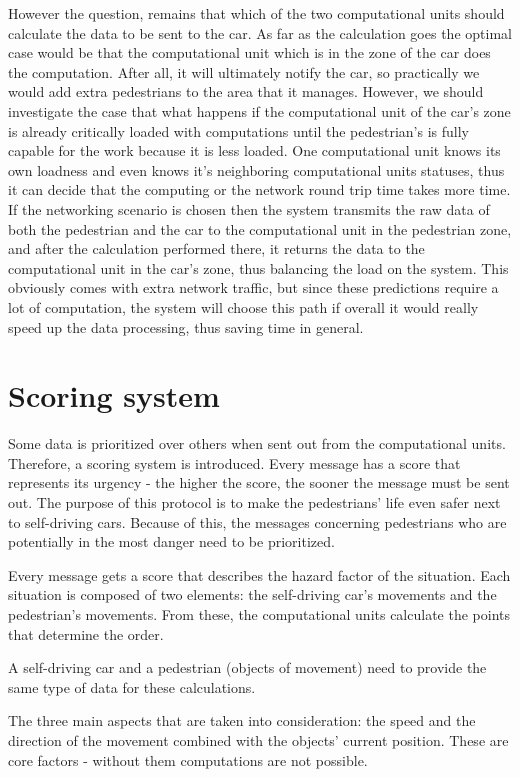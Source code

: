 \documentclass[conference]{IEEEtran}
\begin{document}
However the question, remains that which of the two computational units should calculate the data to be sent to the car. As far as the calculation goes the optimal case would be that the computational unit which is in the zone of the car does the computation. After all, it will ultimately notify the car, so practically we would add extra pedestrians to the area that it manages. However, we should investigate the case that what happens if the computational unit of the car’s zone is already critically loaded with computations until the pedestrian's is fully capable for the work because it is less loaded. One computational unit knows its own loadness and even knows it’s neighboring computational units statuses, thus it can decide that the computing or the network round trip time takes more time. If the networking scenario is chosen then the system transmits the raw data of both the pedestrian and the car to the computational unit in the pedestrian zone, and after the calculation performed there, it returns the data to the computational unit in the car’s zone, thus balancing the load on the system. This obviously comes with extra network traffic, but since these predictions require a lot of computation, the system will choose this path if overall it would really speed up the data processing, thus saving time in general.

\section{Scoring system}

Some data is prioritized over others when sent out from the computational units. Therefore, a scoring system is introduced. Every message has a score that represents its urgency - the higher the score, the sooner the message must be sent out. The purpose of this protocol is to make the pedestrians’ life even safer next to self-driving cars. Because of this, the messages concerning pedestrians who are potentially in the most danger need to be prioritized.

Every message gets a score that describes the hazard factor of the situation. Each situation is composed of two elements: the self-driving car's movements and the pedestrian's movements. From these, the computational units calculate the points that determine the order.

A self-driving car and a pedestrian (objects of movement) need to provide the same type of data for these calculations.

The three main aspects that are taken into consideration: the speed and the direction of the movement combined with the objects’ current position. These are core factors - without them computations are not possible.
\end{document}
